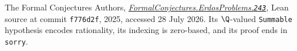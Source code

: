  The Formal Conjectures Authors,
  \href{https://github.com/google-deepmind/formal-conjectures/blob/f776d2f2039351b00737ffcafb9d7d7666e1d9af/FormalConjectures/ErdosProblems/243.lean}
  {\emph{FormalConjectures.ErdosProblems.\texttt{243}}},
  Lean source at commit \texttt{f776d2f}, 2025, accessed 28 July 2026.
  Its $\Q$-valued \texttt{Summable} hypothesis encodes rationality, its
  indexing is zero-based, and its proof ends in \texttt{sorry}.
